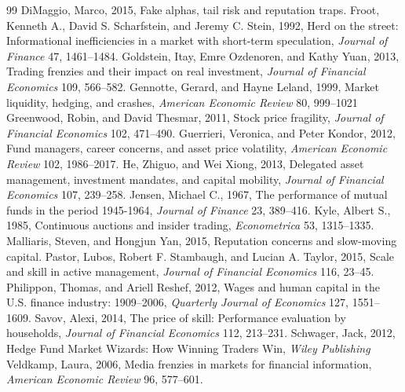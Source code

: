 \begin{thebibliography}{99}
\bibitem{} DiMaggio, Marco, 2015, Fake alphas, tail risk and reputation traps.
\bibitem{} Froot, Kenneth A., David S. Scharfstein, and Jeremy C. Stein, 1992, Herd on the street: Informational inefficiencies in a market with short-term speculation, {\it Journal of Finance} 47, 1461--1484.
\bibitem{} Goldstein, Itay, Emre Ozdenoren, and Kathy Yuan, 2013, Trading frenzies and their impact on real
investment, {\it Journal of Financial Economics} 109, 566--582.
\bibitem{} Gennotte, Gerard, and Hayne Leland, 1999, Market liquidity, hedging, and crashes, {\it American Economic Review} 80, 999--1021
\bibitem{} Greenwood, Robin, and David Thesmar, 2011, Stock price fragility, {\it Journal of Financial Economics}
102, 471--490.
\bibitem{} Guerrieri, Veronica, and Peter Kondor, 2012, Fund managers, career concerns, and asset price volatility, {\it American Economic Review} 102, 1986--2017.
\bibitem{} He, Zhiguo, and Wei Xiong, 2013, Delegated asset management, investment mandates, and capital mobility, {\it Journal of Financial Economics} 107, 239--258.
\bibitem{} Jensen, Michael C., 1967, The performance of mutual funds in the period 1945-1964, {\it Journal of Finance} 23, 389--416.
\bibitem{} Kyle, Albert S., 1985, Continuous auctions and insider trading, {\it Econometrica} 53, 1315--1335.
\bibitem{} Malliaris, Steven, and Hongjun Yan, 2015, Reputation concerns and slow-moving capital.
\bibitem{} Pastor, Lubos, Robert F. Stambaugh, and Lucian A. Taylor, 2015, Scale and skill in active management, {\it Journal of Financial Economics} 116, 23--45.
\bibitem{} Philippon, Thomas, and Ariell Reshef, 2012, Wages and human capital in the U.S. finance industry: 1909--2006, {\it Quarterly Journal of Economics} 127, 1551--1609.
\bibitem{} Savov, Alexi, 2014, The price of skill: Performance evaluation by households, {\it Journal of Financial Economics} 112, 213--231.
\bibitem{} Schwager, Jack, 2012, Hedge Fund Market Wizards: How Winning Traders Win, {\it Wiley Publishing}
\bibitem{} Veldkamp, Laura, 2006, Media frenzies in markets for financial information, {\it American Economic Review} 96, 577--601.

\end{thebibliography}